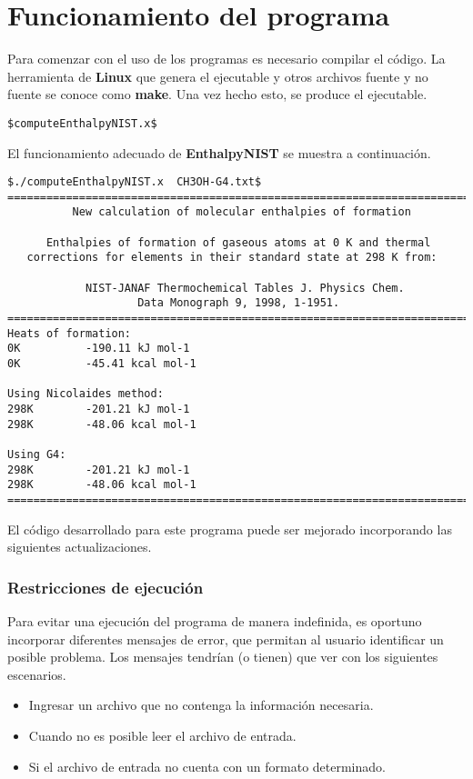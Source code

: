 \chapter{Funcionamiento del programa}


Para comenzar con el uso de los programas es necesario compilar el código. La herramienta de \textbf{Linux} que genera el ejecutable y otros archivos fuente y no fuente se conoce como \textbf{make}. Una vez hecho esto, se produce el ejecutable.
\begin{lstlisting}
$computeEnthalpyNIST.x$
\end{lstlisting}

El funcionamiento adecuado de \textbf{EnthalpyNIST} se muestra a continuación.

\begin{lstlisting}[caption = Output de CH3OH-G4.txt en EnthalpyNIST]
$./computeEnthalpyNIST.x  CH3OH-G4.txt$
========================================================================
          New calculation of molecular enthalpies of formation

      Enthalpies of formation of gaseous atoms at 0 K and thermal 
   corrections for elements in their standard state at 298 K from:

            NIST-JANAF Thermochemical Tables J. Physics Chem. 
                    Data Monograph 9, 1998, 1-1951.
========================================================================
Heats of formation:
0K          -190.11 kJ mol-1
0K          -45.41 kcal mol-1

Using Nicolaides method:
298K        -201.21 kJ mol-1
298K        -48.06 kcal mol-1

Using G4: 
298K        -201.21 kJ mol-1
298K        -48.06 kcal mol-1
========================================================================
\end{lstlisting}

El código desarrollado para este programa puede ser mejorado incorporando las siguientes actualizaciones. 

\subsection*{Restricciones de ejecución}
Para evitar una ejecución del programa de manera indefinida, es oportuno incorporar diferentes mensajes de error, que permitan al usuario identificar un posible problema. Los mensajes tendrían (o tienen) que ver con los siguientes escenarios.
\begin{itemize}
	\item Ingresar un archivo que no contenga la información necesaria.
	\item Cuando no es posible leer el archivo de entrada.
	\item Si el archivo de entrada no cuenta con un formato determinado.
\end{itemize}

